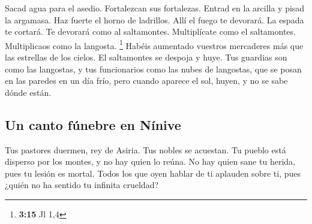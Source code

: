  Sacad agua para el asedio. Fortalezcan sus fortalezas.
Entrad en la arcilla y pisad la argamasa. Haz fuerte el horno de
ladrillos.  Allí el fuego te devorará. La espada te
cortará. Te devorará como al saltamontes. Multiplícate como el
saltamontes. Multiplicaos como la langosta. \footnote{\textbf{3:15} Jl
  1,4}  Habéis aumentado vuestros mercaderes más que las
estrellas de los cielos. El saltamontes se despoja y huye.
 Tus guardias son como las langostas, y tus funcionarios
como las nubes de langostas, que se posan en las paredes en un día frío,
pero cuando aparece el sol, huyen, y no se sabe dónde están.

\hypertarget{un-canto-fuxfanebre-en-nuxednive}{%
\subsection{Un canto fúnebre en
Nínive}\label{un-canto-fuxfanebre-en-nuxednive}}

 Tus pastores duermen, rey de Asiria. Tus nobles se
acuestan. Tu pueblo está disperso por los montes, y no hay quien lo
reúna.  No hay quien sane tu herida, pues tu lesión es
mortal. Todos los que oyen hablar de ti aplauden sobre ti, pues ¿quién
no ha sentido tu infinita crueldad?
